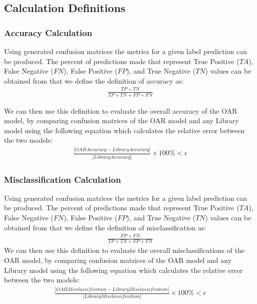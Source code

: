 \documentclass[12pt, titlepage]{article}
\begin{document}
\subsection{Calculation Definitions}

\subsubsection{Accuracy Calculation} \label{accuracy_calc}

Using generated confusion matrices the metrics for a given label prediction can be produced. The percent of predictions made
that represent True Positive ($TA$), False Negative ($FN$), False Positive ($FP$), and True Negative ($TN$) values can be obtained 
from that we define the definition of accuracy as:
\begin{gather}
\frac{TP + TN}{TP + TN + FP + FN}
\end{gather}

We can then use this definition to evaluate the overall accuracy of the OAR model, by comparing confusion matrices of the OAR model 
and any Library model using the following equation which calculates the relative error between the two models:
\begin{gather}
\frac{|OAR Accuracy - Library Accuracy|}{|Library Accuracy|} \times 100\% < \epsilon
\end{gather}
\subsubsection{Misclassification Calculation} \label{misclass_calc}

Using generated confusion matrices the metrics for a given label prediction can be produced. The percent of predictions made
that represent True Positive ($TA$), False Negative ($FN$), False Positive ($FP$), and True Negative ($TN$) values can be obtained 
from that we define the definition of misclassification as:
\begin{gather}
\frac{FP + FN}{TP + TN + FP + FN}
\end{gather}
We can then use this definition to evaluate the overall misclassifications of the OAR model, by comparing confusion matrices of the OAR model 
and any Library model using the following equation which calculates the relative error between the two models:
\begin{gather}
\frac{|OAR Misclassification - Library Misclassification|}{|Library Misclassification|} \times 100\% < \epsilon
\end{gather}
\end{document}
